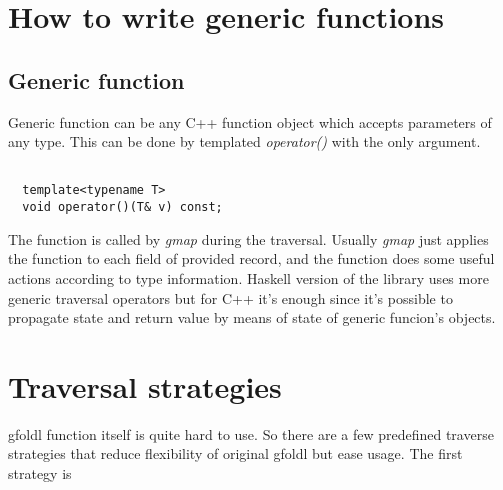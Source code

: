 \documentclass[a4paper]{article}
\begin{document}
\begin{comment}
\paragraph{everything}

Generic function which executes generic function passed to it as parameter for each sub member of specified object recursively.

\paragraph{Path combinators}

Expression for accessing some node in a heterogeneous try of objects.

\end{comment}

\section{How to write generic functions}

\subsection{Generic function}

Generic function can be any C++ function object which accepts parameters of any type. 
This can be done by templated \emph{operator()} with the only argument. 


\begin{lstlisting}

  template<typename T>
  void operator()(T& v) const;

\end{lstlisting}

The function is called by \emph{gmap} during the traversal. Usually \emph{gmap} 
just applies the function to each field of provided record, and the function does
some useful actions according to type information. Haskell version of the library 
uses more generic traversal operators but for C++ it's enough since it's possible
to propagate state and return value by means of state of generic funcion's objects.


\section{Traversal strategies}

gfoldl function itself is quite hard to use. So there are a few predefined 
traverse strategies that reduce flexibility of original gfoldl but ease usage.
The first strategy is 
\end{document}
